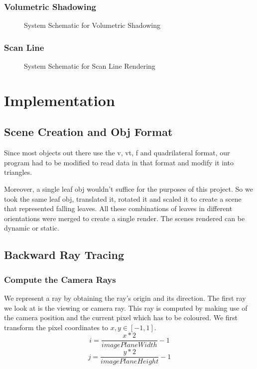 \documentclass[paper=a4, fontsize=11pt]{scrartcl}
\numberwithin{equation}{section}		%
\numberwithin{figure}{section}			%
\numberwithin{table}{section}				%
\begin{document}
\subsubsection{Volumetric Shadowing}
\vspace{20pt}
\begin{figure}[h]
\centering
{}
\caption{System Schematic for Volumetric Shadowing}
\end{figure}


\subsubsection{Scan Line}
\vspace{20pt}
\begin{figure}[h]
\centering
{}
\caption{System Schematic for Scan Line Rendering}
\end{figure}

\newpage
\section{Implementation}
\subsection{Scene Creation and Obj Format}
Since most objects out there use the v, vt, f and quadrilateral format, our program had to be modified to read data in that format and modify it into triangles.
\par
Moreover, a single leaf obj wouldn't suffice for the purposes of this project. So we took the same leaf obj, translated it, rotated it and scaled it to create a scene that represented falling leaves. All these combinations of leaves in different orientations were merged to create a single render. The scenes rendered can be dynamic or static.

\subsection{Backward Ray Tracing}
\subsubsection{Compute the Camera Rays}
We represent a ray by obtaining the ray's origin and its direction. The first ray we look at is the viewing or camera ray. This ray is computed by making use of the camera position and the current pixel which has to be coloured. We first transform the pixel coordinates to $x, y \in [-1, 1]$.
\[ i = \dfrac{x * 2}{imagePlaneWidth} - 1 \]
\[ j = \dfrac{y * 2}{imagePlaneHeight} - 1 \]
\end{document}
